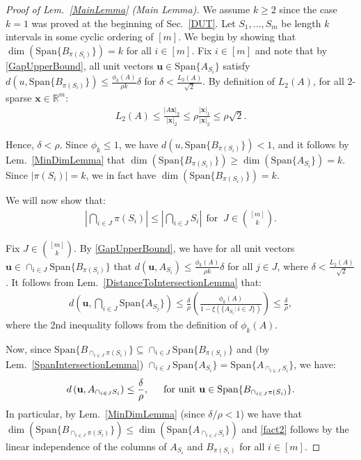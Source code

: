\documentclass[journal, twocolumn]{IEEEtran}
\begin{document}
\begin{proof}[Proof of Lem.~\ref{MainLemma} (Main Lemma)]
We assume $k \geq 2$ since the case $k = 1$ was proved at the beginning of Sec.~\ref{DUT}. Let $S_1, \ldots, S_m$ be length $k$ intervals in some cyclic ordering of $[m]$. We begin by showing that $\dim(\text{Span}\{B_{\pi(S_i)}\}) = k$ for all $i \in [m]$. 
Fix $i \in [m]$ and note that by \eqref{GapUpperBound}, all unit vectors $\mathbf{u} \in \text{Span}\{A_{S_i}\}$ satisfy $d(u, \text{Span}\{B_{\pi(S_i)}\}) \leq \frac{\phi_k(A)}{\rho k} \delta$ for $\delta < \frac{L_2(A)}{ \sqrt{2}}$. By definition of $L_2(A)$, for all $2$-sparse $\mathbf{x} \in \mathbb{R}^m$:
\begin{align*}
L_2(A) \leq \frac{|A\mathbf{x}|_2}{|\mathbf{x}|_2} \leq \rho \frac{|\mathbf{x}|_1}{|\mathbf{x}|_2} \leq \rho \sqrt{2}.
\end{align*}

Hence, $\delta < \rho$. Since $\phi_k \leq 1$, we have $d(u, \text{Span}\{B_{\pi(S_i)}\}) < 1$, and it follows by Lem.~\ref{MinDimLemma} that $\dim(\text{Span}\{B_{\pi(S_i)}\}) \geq \dim(\text{Span}\{A_{S_i}\}) = k$. Since $|\pi(S_i)| = k$, we in fact have $\dim(\text{Span}\{B_{\pi(S_i)}\}) = k$. %

We will now show that:
\begin{align}\label{fact2}
|\bigcap_{i \in J} \pi(S_i)| \leq |\bigcap_{i \in J} S_i | \ \ \text{for } \ J \in {[m] \choose k}.
\end{align}

Fix $J \in {[m] \choose k}$. By \eqref{GapUpperBound}, we have for all unit vectors $\mathbf{u} \in \cap_{i \in J} \text{Span}\{B_{\pi(S_i)}\}$ that $d(\mathbf{u}, A_{S_i}) \leq \frac{\phi_k(A)}{\rho k} \delta$ for all $j \in J$, where $\delta < \frac{L_2(A)}{\sqrt{2}}$. It follows from Lem.~\ref{DistanceToIntersectionLemma} that:
\begin{align*}
d\left( \mathbf{u}, \bigcap_{i \in J} \text{Span}\{A_{S_j}\} \right) 
\leq \frac{\delta}{\rho} \left( \frac{ \phi_k(A) }{1 - \xi( \{ A_{S_i}: i \in J\} ) } \right) \leq \frac{\delta}{\rho},
\end{align*}
%
where the 2nd inequality follows from the definition of $\phi_k(A)$. 

Now, since \mbox{$\text{Span}\{B_{\cap_{i \in J}\pi(S_i)}\} \subseteq \cap_{i \in J} \text{Span}\{B_{\pi(S_i)}\}$} and (by Lem.~\ref{SpanIntersectionLemma}) $\cap_{i \in J}  \text{Span}\{A_{S_i}\} = \text{Span}\{A_{\cap_{i \in J}  S_i}\}$, we have:
\begin{align}\label{fact1}
d\left( \mathbf{u}, A_{\cap_{i \in J} S_i} \right) \leq \frac{\delta}{\rho}, \indent \text{for unit } \mathbf{u} \in \text{Span}\{B_{\cap_{i \in J}\pi(S_i)}\}.
\end{align}
In particular, by Lem.~\ref{MinDimLemma} (since $\delta/\rho < 1$) we have that $\dim(\text{Span}\{B_{\cap_{i \in J}\pi(S_i)}\}) \leq \dim(\text{Span}\{A_{\cap_{i \in J} S_i}\})$ and \eqref{fact2} follows by the linear independence of the columns of $A_{S_i}$ and $B_{\pi(S_i)}$ for all $i \in [m]$.


\end{proof}
\end{document}
